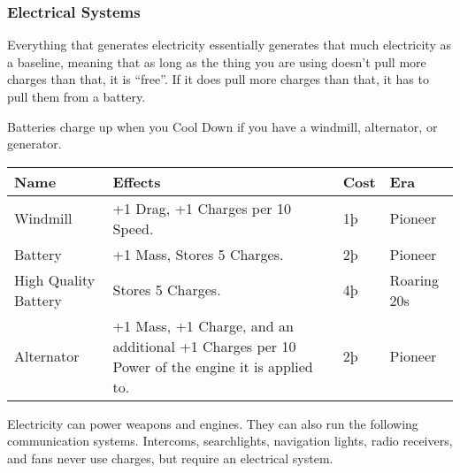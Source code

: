 \documentclass{article}
\begin{document}
\subsubsection{Electrical Systems}
\label{_Electrical Systems}

Everything that generates electricity essentially generates that much
electricity as a baseline, meaning that as long as the thing you are
using doesn't pull more charges than that, it is ``free''. If it does
pull more charges than that, it has to pull them from a battery.

\hfill\break
Batteries charge up when you Cool Down if you have a windmill,
alternator, or generator.

\begin{tabular}{|l|l|l|l|}
    \hline
    Name                                  & Effects                                                 & Cost    & Era         \\\hline
    Windmill                              & +1 Drag, +1 Charges per 10 Speed.                       & 1þ      & Pioneer     \\\hline
    Battery                               & +1 Mass, Stores 5 Charges.                              & 2þ      & Pioneer     \\\hline
    High Quality Battery                  & Stores 5 Charges.                                       & 4þ      & Roaring 20s \\\hline
    Alternator                            & +1 Mass, +1 Charge, and an additional +1 Charges per 10
    Power of the engine it is applied to. & 2þ                                                      & Pioneer               \\\hline
\end{tabular}

Electricity can power weapons and engines. They can also run the
following communication systems. Intercoms, searchlights, navigation
lights, radio receivers, and fans never use charges, but require an
electrical system.
\end{document}
